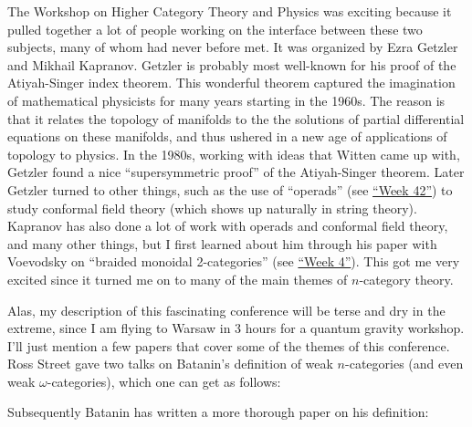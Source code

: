 \documentclass{article}
\def\tightlist{}
\renewcommand{\texttt}[1]{%
  \begingroup
  \ttfamily
  \begingroup\lccode`~=`/\lowercase{\endgroup\def~}{/\discretionary{}{}{}}%
  \begingroup\lccode`~=`[\lowercase{\endgroup\def~}{[\discretionary{}{}{}}%
  \begingroup\lccode`~=`.\lowercase{\endgroup\def~}{.\discretionary{}{}{}}%
  \catcode`/=\active\catcode`[=\active\catcode`.=\active
  \scantokens{#1\noexpand}%
  \endgroup
}
\begin{document}
The Workshop on Higher Category Theory and Physics was exciting because
it pulled together a lot of people working on the interface between
these two subjects, many of whom had never before met. It was organized
by Ezra Getzler and Mikhail Kapranov. Getzler is probably most
well-known for his proof of the Atiyah-Singer index theorem. This
wonderful theorem captured the imagination of mathematical physicists
for many years starting in the 1960s. The reason is that it relates the
topology of manifolds to the the solutions of partial differential
equations on these manifolds, and thus ushered in a new age of
applications of topology to physics. In the 1980s, working with ideas
that Witten came up with, Getzler found a nice ``supersymmetric proof''
of the Atiyah-Singer theorem. Later Getzler turned to other things, such
as the use of ``operads'' (see \protect\hyperlink{week42}{``Week 42''})
to study conformal field theory (which shows up naturally in string
theory). Kapranov has also done a lot of work with operads and conformal
field theory, and many other things, but I first learned about him
through his paper with Voevodsky on ``braided monoidal 2-categories''
(see \protect\hyperlink{week4}{``Week 4''}). This got me very excited
since it turned me on to many of the main themes of \(n\)-category
theory.

Alas, my description of this fascinating conference will be terse and
dry in the extreme, since I am flying to Warsaw in 3 hours for a quantum
gravity workshop. I'll just mention a few papers that cover some of the
themes of this conference. Ross Street gave two talks on Batanin's
definition of weak \(n\)-categories (and even weak
\(\omega\)-categories), which one can get as follows:


Subsequently Batanin has written a more thorough paper on his
definition:

\end{document}
